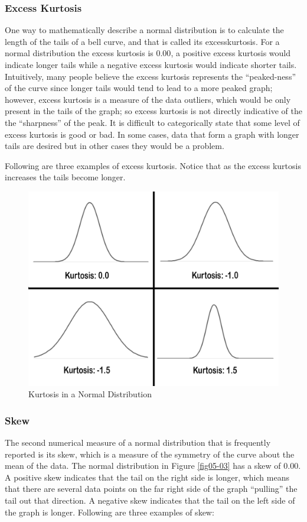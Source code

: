 \subsubsection{Excess Kurtosis}
One way to mathematically describe a normal distribution is to calculate the length of the tails of a bell curve, and that is called its \gls{excesskurtosis}. For a normal distribution the excess kurtosis is $ 0.00 $, a positive excess kurtosis would indicate longer tails while a negative excess kurtosis would indicate shorter tails. Intuitively, many people believe the excess kurtosis represents the ``peaked-ness'' of the curve since longer tails would tend to lead to a more peaked graph; however, excess kurtosis is a measure of the data outliers, which would be only present in the tails of the graph; so excess kurtosis is not directly indicative of the the ``sharpness'' of the peak. It is difficult to categorically state that some level of excess kurtosis is good or bad. In some cases, data that form a graph with longer tails are desired but in other cases they would be a problem.

Following are three examples of excess kurtosis. Notice that as the excess kurtosis increases the tails become longer. 

\begin{figure}[H]
	\centering
	\includegraphics[width=\maxwidth{.95\linewidth}]{gfx/06-Kurtosis}
	\caption{Kurtosis in a Normal Distribution}
	\label{fig06-02}
\end{figure}

\subsubsection{Skew}
The second numerical measure of a normal distribution that is frequently reported is its \gls{skew}, which is a measure of the symmetry of the curve about the mean of the data. The normal distribution in Figure \ref{fig05-03} has a skew of $ 0.00 $. A positive skew indicates that the tail on the right side is longer, which means that there are several data points on the far right side of the graph ``pulling'' the tail out that direction. A negative skew indicates that the tail on the left side of the graph is longer. Following are three examples of skew:


